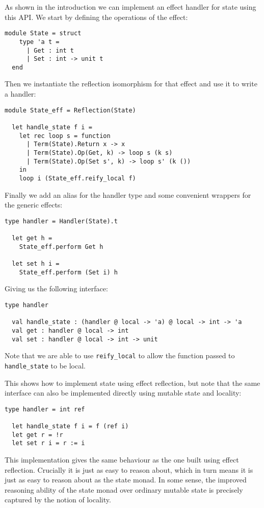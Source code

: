\documentclass[acmsmall, screen, review, anonymous]{acmart}
\theoremstyle{definition}
\begin{document}
As shown in the introduction we can implement an effect handler for
state using this API. We start by defining the operations of the effect:
\begin{lstlisting}[style=oxcaml]
  module State = struct
    type 'a t =
      | Get : int t
      | Set : int -> unit t
  end
\end{lstlisting}
Then we instantiate the reflection isomorphism for that effect and use
it to write a handler:
\begin{lstlisting}[style=oxcaml]
  module State_eff = Reflection(State)

  let handle_state f i =
    let rec loop s = function
      | Term(State).Return x -> x
      | Term(State).Op(Get, k) -> loop s (k s)
      | Term(State).Op(Set s', k) -> loop s' (k ())
    in
    loop i (State_eff.reify_local f)
\end{lstlisting}
Finally we add an alias for the handler type and some convenient
wrappers for the generic effects:
\begin{lstlisting}[style=oxcaml]
  type handler = Handler(State).t

  let get h =
    State_eff.perform Get h

  let set h i =
    State_eff.perform (Set i) h
\end{lstlisting}
Giving us the following interface:
\begin{lstlisting}[style=oxcaml]
  type handler

  val handle_state : (handler @ local -> 'a) @ local -> int -> 'a
  val get : handler @ local -> int
  val set : handler @ local -> int -> unit
\end{lstlisting}
Note that we are able to use \lstinline[style=oxcaml]{reify_local} to allow
the function passed to \lstinline[style=oxcaml]{handle_state} to be local.

This shows how to implement state using effect reflection, but note that
the same interface can also be implemented directly using mutable state
and locality:
\begin{lstlisting}[style=oxcaml]
  type handler = int ref

  let handle_state f i = f (ref i)
  let get r = !r
  let set r i = r := i
\end{lstlisting}
This implementation gives the same behaviour as the one built using
effect reflection. Crucially it is just as easy to reason about, which
in turn means it is just as easy to reason about as the state monad. In
some sense, the improved reasoning ability of the state monad over
ordinary mutable state is precisely captured by the notion of locality.
\end{document}
